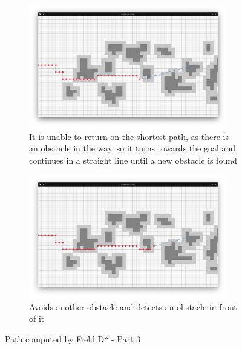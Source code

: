 \begin{figure}
	\begin{center}
		\begin{subfigure}[t]{\textwidth}
			\includegraphics[width=0.95\textwidth]{./img/gv_5.png}
			\caption{It is unable to return on the shortest path, as there is an obstacle in the way, so it turns towards the goal and continues in a straight line until a new obstacle is found}\label{fig:gv-5}
		\end{subfigure}
		\begin{subfigure}[t]{\textwidth}
			\includegraphics[width=0.95\textwidth]{./img/gv_6.png}
			\caption{Avoids another obstacle and detects an obstacle in front of it}\label{fig:gv-6}
		\end{subfigure}
	\end{center}
	\caption{Path computed by Field D* - Part 3}\label{fig:gv-c}
\end{figure}
